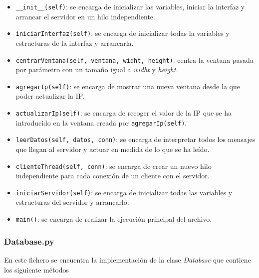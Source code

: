 \begin{itemize}
	\item \verb|__init__(self)|: se encarga de inicializar las variables, iniciar la interfaz y arrancar el servidor en un hilo independiente.
	\item \verb|iniciarInterfaz(self)|: se encarga de inicializar todas la variables y estructuras de la interfaz y arrancarla.
	\item \verb|centrarVentana(self, ventana, widht, height)|: centra la ventana pasada por parámetro con un tamaño igual a \textit{widht} y \textit{height}.
	\item \verb|agregarIp(self)|: se encarga de mostrar una nueva ventana desde la que poder actualizar la IP.
	\item \verb|actualizarIp(self)|: se encarga de recoger el valor de la IP que se ha introducido en la ventana creada por \verb|agregarIp(self)|.
	\item \verb|leerDatos(self, datos, conn)|: se encarga de interpretar todos los mensajes que llegan al servidor y actuar en medida de lo que se ha leído.
	\item \verb|clienteThread(self, conn)|: se encarga de crear un nuevo hilo independiente para cada conexión de un cliente con el servidor.
	\item \verb|iniciarServidor(self)|: se encarga de inicializar todas las variables y estructuras del servidor y arrancarlo.
	\item \verb|main()|: se encarga de realizar la ejecución principal del archivo.
\end{itemize}

\subsubsection{Database.py}

En este fichero se encuentra la implementación de la clase \textit{Database} que contiene los siguiente métodos

